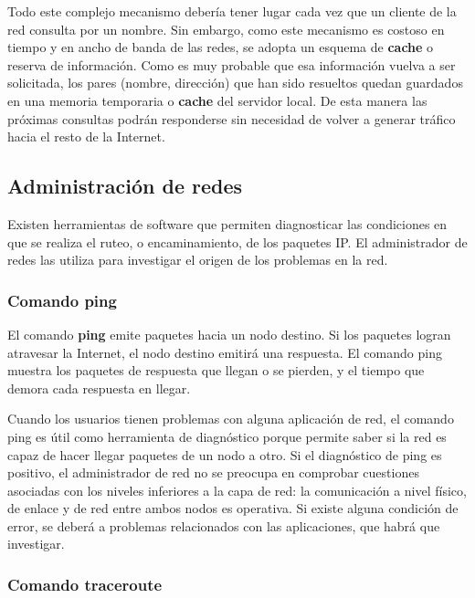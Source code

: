 \documentclass[spanish,A4,]{article}
\begin{document}
Todo este complejo mecanismo debería tener lugar cada vez que un cliente
de la red consulta por un nombre. Sin embargo, como este mecanismo es
costoso en tiempo y en ancho de banda de las redes, se adopta un esquema
de \textbf{cache} o reserva de información. Como es muy probable que esa
información vuelva a ser solicitada, los pares (nombre, dirección) que
han sido resueltos quedan guardados en una memoria temporaria o
\textbf{cache} del servidor local. De esta manera las próximas consultas
podrán responderse sin necesidad de volver a generar tráfico hacia el
resto de la Internet.

\subsection{Administración de redes}\label{administraciuxf3n-de-redes}

Existen herramientas de software que permiten diagnosticar las
condiciones en que se realiza el ruteo, o encaminamiento, de los
paquetes IP. El administrador de redes las utiliza para investigar el
origen de los problemas en la red.

\subsubsection{Comando ping}\label{comando-ping}

El comando \textbf{ping} emite paquetes hacia un nodo destino. Si los
paquetes logran atravesar la Internet, el nodo destino emitirá una
respuesta. El comando ping muestra los paquetes de respuesta que llegan
o se pierden, y el tiempo que demora cada respuesta en llegar.

Cuando los usuarios tienen problemas con alguna aplicación de red, el
comando ping es útil como herramienta de diagnóstico porque permite
saber si la red es capaz de hacer llegar paquetes de un nodo a otro. Si
el diagnóstico de ping es positivo, el administrador de red no se
preocupa en comprobar cuestiones asociadas con los niveles inferiores a
la capa de red: la comunicación a nivel físico, de enlace y de red entre
ambos nodos es operativa. Si existe alguna condición de error, se deberá
a problemas relacionados con las aplicaciones, que habrá que investigar.

\subsubsection{Comando traceroute}\label{comando-traceroute}
\end{document}
